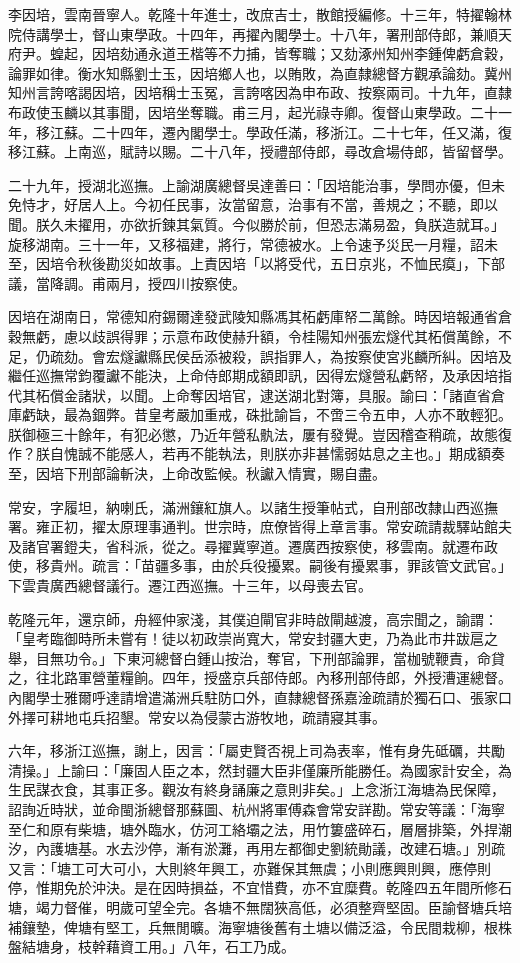 \begin{pinyinscope}
李因培，雲南晉寧人。乾隆十年進士，改庶吉士，散館授編修。十三年，特擢翰林院侍講學士，督山東學政。十四年，再擢內閣學士。十八年，署刑部侍郎，兼順天府尹。蝗起，因培劾通永道王楷等不力捕，皆奪職；又劾涿州知州李鍾俾虧倉穀，論罪如律。衡水知縣劉士玉，因培鄉人也，以賄敗，為直隸總督方觀承論劾。冀州知州言誇喀謁因培，因培稱士玉冤，言誇喀因為申布政、按察兩司。十九年，直隸布政使玉麟以其事聞，因培坐奪職。甫三月，起光祿寺卿。復督山東學政。二十一年，移江蘇。二十四年，遷內閣學士。學政任滿，移浙江。二十七年，任又滿，復移江蘇。上南巡，賦詩以賜。二十八年，授禮部侍郎，尋改倉場侍郎，皆留督學。

二十九年，授湖北巡撫。上諭湖廣總督吳達善曰：「因培能治事，學問亦優，但未免恃才，好居人上。今初任民事，汝當留意，治事有不當，善規之；不聽，即以聞。朕久未擢用，亦欲折鍊其氣質。今似勝於前，但恐志滿易盈，負朕造就耳。」旋移湖南。三十一年，又移福建，將行，常德被水。上令速予災民一月糧，詔未至，因培令秋後勘災如故事。上責因培「以將受代，五日京兆，不恤民瘼」，下部議，當降調。甫兩月，授四川按察使。

因培在湖南日，常德知府錫爾達發武陵知縣馮其柘虧庫帑二萬餘。時因培報通省倉穀無虧，慮以歧誤得罪；示意布政使赫升額，令桂陽知州張宏燧代其柘償萬餘，不足，仍疏劾。會宏燧讞縣民侯岳添被殺，誤指罪人，為按察使宮兆麟所糾。因培及繼任巡撫常鈞覆讞不能決，上命侍郎期成額即訊，因得宏燧營私虧帑，及承因培指代其柘償金諸狀，以聞。上命奪因培官，逮送湖北對簿，具服。諭曰：「諸直省倉庫虧缺，最為錮弊。昔皇考嚴加重戒，硃批諭旨，不啻三令五申，人亦不敢輕犯。朕御極三十餘年，有犯必懲，乃近年營私骫法，屢有發覺。豈因稽查稍疏，故態復作？朕自愧誠不能感人，若再不能執法，則朕亦非甚懦弱姑息之主也。」期成額奏至，因培下刑部論斬決，上命改監候。秋讞入情實，賜自盡。

常安，字履坦，納喇氏，滿洲鑲紅旗人。以諸生授筆帖式，自刑部改隸山西巡撫署。雍正初，擢太原理事通判。世宗時，庶僚皆得上章言事。常安疏請裁驛站館夫及諸官署鐙夫，省科派，從之。尋擢冀寧道。遷廣西按察使，移雲南。就遷布政使，移貴州。疏言：「苗疆多事，由於兵役擾累。嗣後有擾累事，罪該管文武官。」下雲貴廣西總督議行。遷江西巡撫。十三年，以母喪去官。

乾隆元年，還京師，舟經仲家淺，其僕迫閘官非時啟閘越渡，高宗聞之，諭謂：「皇考臨御時所未嘗有！徒以初政崇尚寬大，常安封疆大吏，乃為此市井跋扈之舉，目無功令。」下東河總督白鍾山按治，奪官，下刑部論罪，當枷號鞭責，命貸之，往北路軍營董糧餉。四年，授盛京兵部侍郎。內移刑部侍郎，外授漕運總督。內閣學士雅爾呼達請增遣滿洲兵駐防口外，直隸總督孫嘉淦疏請於獨石口、張家口外擇可耕地屯兵招墾。常安以為侵蒙古游牧地，疏請寢其事。

六年，移浙江巡撫，謝上，因言：「屬吏賢否視上司為表率，惟有身先砥礪，共勵清操。」上諭曰：「廉固人臣之本，然封疆大臣非僅廉所能勝任。為國家計安全，為生民謀衣食，其事正多。觀汝有終身誦廉之意則非矣。」上念浙江海塘為民保障，詔詢近時狀，並命閩浙總督那蘇圖、杭州將軍傅森會常安詳勘。常安等議：「海寧至仁和原有柴塘，塘外臨水，仿河工絡壩之法，用竹簍盛碎石，層層排築，外捍潮汐，內護塘基。水去沙停，漸有淤灘，再用左都御史劉統勛議，改建石塘。」別疏又言：「塘工可大可小，大則終年興工，亦難保其無虞；小則應興則興，應停則停，惟期免於沖決。是在因時損益，不宜惜費，亦不宜糜費。乾隆四五年間所修石塘，竭力督催，明歲可望全完。各塘不無闊狹高低，必須整齊堅固。臣諭督塘兵培補鑲墊，俾塘有堅工，兵無閒曠。海寧塘後舊有土塘以備泛溢，令民間栽柳，根株盤結塘身，枝幹藉資工用。」八年，石工乃成。


\end{pinyinscope}
